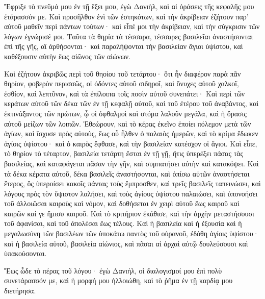 {\par }{\PP {}Ἔφριξε τὸ πνεῦμά μου ἐν τῇ ἕξει μου, ἐγὼ Δανιὴλ, καὶ αἱ ὁράσεις τῆς κεφαλῆς μου ἐτάρασσόν με.
Καὶ προσῆλθον ἑνὶ τῶν ἑστηκότων, καὶ τὴν ἀκρίβειαν ἐζήτουν παρʼ αὐτοῦ μαθεῖν περὶ πάντων τούτων· καὶ εἶπέ μοι τὴν ἀκρίβειαν, καὶ τὴν σύγκρισιν τῶν λόγων ἐγνώρισέ μοι.
Ταῦτα τὰ θηρία τὰ τέσσαρα, τέσσαρες βασιλεῖαι ἀναστήσονται ἐπὶ τῆς γῆς, αἳ ἀρθήσονται·
καὶ παραλήψονται τὴν βασιλείαν ἅγιοι ὑψίστου, καὶ καθέξουσιν αὐτὴν ἕως αἰῶνος τῶν αἰώνων.
\par }{\PP {}Καὶ ἐζήτουν ἀκριβῶς περὶ τοῦ θηοίου τοῦ τετάρτου· ὃτι ἦν διαφέρον παρὰ πᾶν θηρίον, φοβερὸν περισσῶς, οἱ ὀδόντες αὐτοῦ σιδηροῖ, καὶ ὄνυχες αὐτοῦ χαλκοῖ, ἐσθίον, καὶ λεπτῦνον, καὶ τὰ ἐπίλοιπα τοῖς ποσὶν αὐτοῦ συνεπάτει·
Καὶ περὶ τῶν κεράτων αὐτοῦ τῶν δέκα τῶν ἐν τῇ κεφαλῇ αὐτοῦ, καὶ τοῦ ἐτέρου τοῦ ἀναβάντος, καὶ ἐκτινάξαντος τῶν πρώτων, ᾧ οἱ ὀφθαλμοὶ καὶ στόμα λαλοῦν μεγάλα, καὶ ἡ ὅρασις αὐτοῦ μείζων τῶν λοιπῶν.
Ἐθεώρουν, καὶ τὸ κέρας ἐκεῖνο ἐποίει πόλεμον μετὰ τῶν ἁγίων, καὶ ἴσχυσε πρὸς αὐτοὺς,
ἕως οὗ ἦλθεν ὁ παλαιὸς ἡμερῶν, καὶ τὸ κρίμα ἔδωκεν ἁγίοις ὑψίστου· καὶ ὁ καιρὸς ἔφθασε, καὶ τὴν βασιλείαν κατέσχον οἱ ἅγιοι.
Καὶ εἶπε, τὸ θηρίον τὸ τέταρτον, βασιλεία τετάρτη ἔσται ἐν τῇ γῇ, ἥτις ὑπερέξει πάσας τὰς βασιλείας, καὶ καταφάγεται πᾶσαν τὴν γῆν, καὶ συμπατήσει αὐτὴν καὶ κατακόψει.
Καὶ τὰ δέκα κέρατα αὐτοῦ, δέκα βασιλεῖς ἀναστήσονται, καὶ ὀπίσω αὐτῶν ἀναστήσεται ἕτερος, ὃς ὑπεροίσει κακοῖς πάντας τοὺς ἔμπροσθεν, καὶ τρεῖς βασιλεῖς ταπεινώσει,
καὶ λόγους πρὸς τὸν ὕψιστον λαλήσει, καὶ τοὺς ἁγίους ὑψίστου παλαιώσει, καὶ ὑπονοήσει τοῦ ἀλλοιῶσαι καιροὺς καὶ νόμον, καὶ δοθήσεται ἐν χειρὶ αὐτοῦ ἕως καιροῦ καὶ καιρῶν καί γε ἥμισυ καιροῦ.
Καὶ τὸ κριτήριον ἐκάθισε, καὶ τὴν ἀρχὴν μεταστήσουσι τοῦ ἀφανίσαι, καὶ τοῦ ἀπολέσαι ἕως τέλους.
Καὶ ἡ βασιλεία καὶ ἡ ἐξουσία καὶ ἡ μεγαλωσύνη τῶν βασιλέων τῶν ὑποκάτω παντὸς τοῦ οὐρανοῦ, ἐδόθη ἁγίοις ὑψίστου· καὶ ἡ βασιλεία αὐτοῦ, βασιλεία αἰώνιος, καὶ πᾶσαι αἱ ἀρχαὶ αὐτῷ δουλεύσουσι καὶ ὑπακούσονται.
\par }{\PP Ἕως ὧδε τὸ πέρας τοῦ λόγου·
ἐγὼ Δανιήλ, οἱ διαλογισμοί μου ἐπὶ πολὺ συνετάρασσόν με, καὶ ἡ μορφή μου ἠλλοιώθη, καὶ τὸ ῥῆμα ἐν τῇ καρδίᾳ μου διετήρησα.

}

